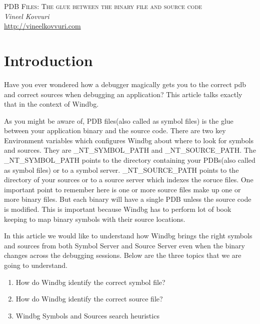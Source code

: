 \documentclass{article}
\begin{document}
\begin{titlepage}
   \begin{center}
      \Large\textsc{PDB Files: The glue between the binary file and source code}\\
      \vspace{5mm}
      \Large\textit{Vineel Kovvuri}\\
      \url{http://vineelkovvuri.com}\\
   \end{center}
\end{titlepage}

\tableofcontents

\newpage
\section{Introduction}
Have you ever wondered how a debugger magically gets you to the correct pdb and correct sources when debugging an application? This article talks exactly that in the context of Windbg.

As you might be aware of, PDB files(also called as symbol files) is the glue between your application binary and the source code. There are two key Environment variables which configures Windbg about where to look for symbols and sources. They are \_NT\_SYMBOL\_PATH and \_NT\_SOURCE\_PATH. The \_NT\_SYMBOL\_PATH points to the directory containing your PDBs(also called as symbol files) or to a symbol server. \_NT\_SOURCE\_PATH points to the directory of your sources or to a source server which indexes the soruce files. One important point to remember here is one or more source files make up one or more binary files. But each binary will have a single PDB unless the source code is modified. This is important because Windbg has to perform lot of book keeping to map binary symbols with their source locations.

In this article we would like to understand how Windbg brings the right symbols and sources from both Symbol Server and Source Server even when the binary changes across the debugging sessions. Below are the three topics that we are going to understand.

\begin{enumerate}[noitemsep]
    \item How do Windbg identify the correct symbol file?
    \item How do Windbg identify the correct source file?
    \item Windbg Symbols and Sources search heuristics
\end{enumerate}
\end{document}
